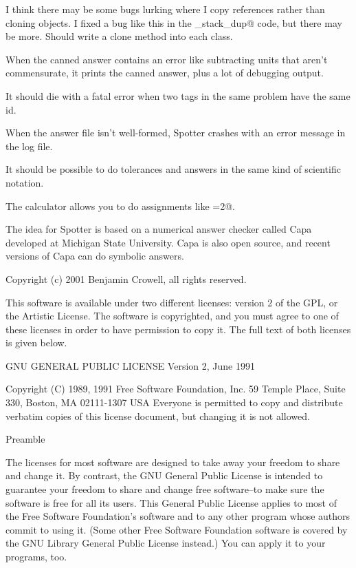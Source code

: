 \documentclass{doc}
\begin{document}
I think there may be some bugs lurking where I copy references rather than
cloning objects. I fixed a bug like this in the \verb@options_stack_dup@ code, but
there may be more. Should write a clone method into each class.


When the canned answer contains an error like subtracting units that aren't
commensurate, it prints the canned answer, plus a lot of debugging output.

It should die with a fatal error when two \verb@find@ tags in the same problem have
the same id.

When the answer file isn't well-formed, Spotter crashes with an error message in
the log file.

It should be possible to do tolerances and answers in the same kind of
scientific notation.


The calculator allows you to do assignments like =2@.

\label{acknowledgements}
The idea for Spotter is based on a numerical answer checker called Capa developed
at Michigan State University. Capa is also open source, and recent versions of
Capa can do symbolic answers.

\label{license}
Copyright (c) 2001 Benjamin Crowell, all rights reserved.

This software is available under two different licenses: 
  version 2 of the GPL, or
  the Artistic License. 
The software is copyrighted, and you must agree to one of
these licenses in order to have permission to copy it. The full
text of both licenses is given below.

		    GNU GENERAL PUBLIC LICENSE
		       Version 2, June 1991

 Copyright (C) 1989, 1991 Free Software Foundation, Inc.
                       59 Temple Place, Suite 330, Boston, MA  02111-1307  USA
 Everyone is permitted to copy and distribute verbatim copies
 of this license document, but changing it is not allowed.

			    Preamble

  The licenses for most software are designed to take away your
freedom to share and change it.  By contrast, the GNU General Public
License is intended to guarantee your freedom to share and change free
software--to make sure the software is free for all its users.  This
General Public License applies to most of the Free Software
Foundation's software and to any other program whose authors commit to
using it.  (Some other Free Software Foundation software is covered by
the GNU Library General Public License instead.)  You can apply it to
your programs, too.
\end{document}
